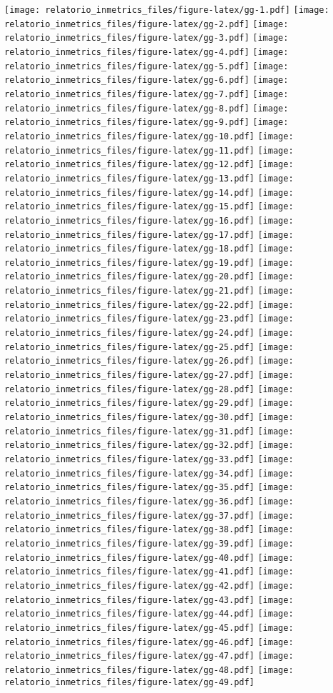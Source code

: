 \documentclass[]{book}
\begin{document}
\texttt{[image: relatorio\_inmetrics\_files/figure-latex/gg-1.pdf]} \texttt{[image: relatorio\_inmetrics\_files/figure-latex/gg-2.pdf]} \texttt{[image: relatorio\_inmetrics\_files/figure-latex/gg-3.pdf]} \texttt{[image: relatorio\_inmetrics\_files/figure-latex/gg-4.pdf]} \texttt{[image: relatorio\_inmetrics\_files/figure-latex/gg-5.pdf]} \texttt{[image: relatorio\_inmetrics\_files/figure-latex/gg-6.pdf]} \texttt{[image: relatorio\_inmetrics\_files/figure-latex/gg-7.pdf]} \texttt{[image: relatorio\_inmetrics\_files/figure-latex/gg-8.pdf]} \texttt{[image: relatorio\_inmetrics\_files/figure-latex/gg-9.pdf]} \texttt{[image: relatorio\_inmetrics\_files/figure-latex/gg-10.pdf]} \texttt{[image: relatorio\_inmetrics\_files/figure-latex/gg-11.pdf]} \texttt{[image: relatorio\_inmetrics\_files/figure-latex/gg-12.pdf]} \texttt{[image: relatorio\_inmetrics\_files/figure-latex/gg-13.pdf]} \texttt{[image: relatorio\_inmetrics\_files/figure-latex/gg-14.pdf]} \texttt{[image: relatorio\_inmetrics\_files/figure-latex/gg-15.pdf]} \texttt{[image: relatorio\_inmetrics\_files/figure-latex/gg-16.pdf]} \texttt{[image: relatorio\_inmetrics\_files/figure-latex/gg-17.pdf]} \texttt{[image: relatorio\_inmetrics\_files/figure-latex/gg-18.pdf]} \texttt{[image: relatorio\_inmetrics\_files/figure-latex/gg-19.pdf]} \texttt{[image: relatorio\_inmetrics\_files/figure-latex/gg-20.pdf]} \texttt{[image: relatorio\_inmetrics\_files/figure-latex/gg-21.pdf]} \texttt{[image: relatorio\_inmetrics\_files/figure-latex/gg-22.pdf]} \texttt{[image: relatorio\_inmetrics\_files/figure-latex/gg-23.pdf]} \texttt{[image: relatorio\_inmetrics\_files/figure-latex/gg-24.pdf]} \texttt{[image: relatorio\_inmetrics\_files/figure-latex/gg-25.pdf]} \texttt{[image: relatorio\_inmetrics\_files/figure-latex/gg-26.pdf]} \texttt{[image: relatorio\_inmetrics\_files/figure-latex/gg-27.pdf]} \texttt{[image: relatorio\_inmetrics\_files/figure-latex/gg-28.pdf]} \texttt{[image: relatorio\_inmetrics\_files/figure-latex/gg-29.pdf]} \texttt{[image: relatorio\_inmetrics\_files/figure-latex/gg-30.pdf]} \texttt{[image: relatorio\_inmetrics\_files/figure-latex/gg-31.pdf]} \texttt{[image: relatorio\_inmetrics\_files/figure-latex/gg-32.pdf]} \texttt{[image: relatorio\_inmetrics\_files/figure-latex/gg-33.pdf]} \texttt{[image: relatorio\_inmetrics\_files/figure-latex/gg-34.pdf]} \texttt{[image: relatorio\_inmetrics\_files/figure-latex/gg-35.pdf]} \texttt{[image: relatorio\_inmetrics\_files/figure-latex/gg-36.pdf]} \texttt{[image: relatorio\_inmetrics\_files/figure-latex/gg-37.pdf]} \texttt{[image: relatorio\_inmetrics\_files/figure-latex/gg-38.pdf]} \texttt{[image: relatorio\_inmetrics\_files/figure-latex/gg-39.pdf]} \texttt{[image: relatorio\_inmetrics\_files/figure-latex/gg-40.pdf]} \texttt{[image: relatorio\_inmetrics\_files/figure-latex/gg-41.pdf]} \texttt{[image: relatorio\_inmetrics\_files/figure-latex/gg-42.pdf]} \texttt{[image: relatorio\_inmetrics\_files/figure-latex/gg-43.pdf]} \texttt{[image: relatorio\_inmetrics\_files/figure-latex/gg-44.pdf]} \texttt{[image: relatorio\_inmetrics\_files/figure-latex/gg-45.pdf]} \texttt{[image: relatorio\_inmetrics\_files/figure-latex/gg-46.pdf]} \texttt{[image: relatorio\_inmetrics\_files/figure-latex/gg-47.pdf]} \texttt{[image: relatorio\_inmetrics\_files/figure-latex/gg-48.pdf]} \texttt{[image: relatorio\_inmetrics\_files/figure-latex/gg-49.pdf]} 
\end{document}
